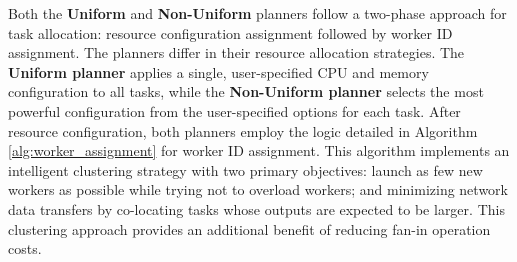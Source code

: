 Both the \textbf{Uniform} and \textbf{Non-Uniform} planners follow a two-phase approach for task allocation: resource configuration assignment followed by worker ID assignment. The planners differ in their resource allocation strategies. The \textbf{Uniform planner} applies a single, user-specified CPU and memory configuration to all tasks, while the \textbf{Non-Uniform planner} selects the most powerful configuration from the user-specified options for each task. After resource configuration, both planners employ the logic detailed in Algorithm \ref{alg:worker_assignment} for worker ID assignment. This algorithm implements an intelligent clustering strategy with two primary objectives: launch as few new workers as possible while trying not to overload workers; and minimizing network data transfers by co-locating tasks whose outputs are expected to be larger. This clustering approach provides an additional benefit of reducing fan-in operation costs.

